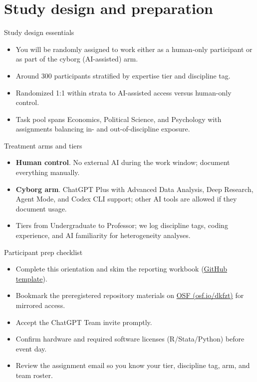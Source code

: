 \documentclass[aspectratio=169,professionalfonts]{beamer}
\begin{document}
\section{Study design and preparation}

\begin{frame}{Study design essentials}
  \begin{itemize}
    \item You will be randomly assigned to work either as a human-only participant or as part of the cyborg (AI-assisted) arm.
    \item Around 300 participants stratified by expertise tier and discipline tag.
    \item Randomized 1:1 within strata to AI-assisted access versus human-only control.
    \item Task pool spans Economics, Political Science, and Psychology with assignments balancing in- and out-of-discipline exposure.
  \end{itemize}
\end{frame}

\begin{frame}{Treatment arms and tiers}
  \begin{itemize}
    \item \textbf{Human control}. No external AI during the work window; document everything manually.
    \item \textbf{Cyborg arm}. ChatGPT Plus with Advanced Data Analysis, Deep Research, Agent Mode, and Codex CLI support; other AI tools are allowed if they document usage.
    \item Tiers from Undergraduate to Professor; we log discipline tags, coding experience, and AI familiarity for heterogeneity analyses.
  \end{itemize}
\end{frame}

\begin{frame}{Participant prep checklist}
  \begin{itemize}
    \item Complete this orientation and skim the reporting workbook (\href{https://github.com/I4Replication/AI-vertical/blob/main/Reports/Replication_Log_Referee_Template.xlsx}{GitHub template}).
    \item Bookmark the preregistered repository materials on \href{https://osf.io/dkfzt/}{OSF (osf.io/dkfzt)} for mirrored access.
    \item Accept the ChatGPT Team invite promptly.
    \item Confirm hardware and required software licenses (R/Stata/Python) before event day.
    \item Review the assignment email so you know your tier, discipline tag, arm, and team roster.
  \end{itemize}
\end{frame}
\end{document}

